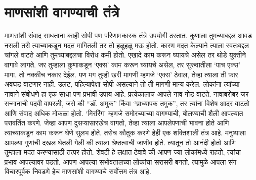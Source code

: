 \section*{माणसांशी वागण्याची तंत्रे}
माणसांशी संवाद साधताना काही सोपी पण परिणामकारक तंत्रे उपयोगी ठरतात. कुणाला तुमच्याबद्दल आवड नसली तरी त्याच्याकडून मदत मागितली तर तो हळूहळू मऊ होतो. कारण मदत केल्याने त्याला स्वतःबद्दल चांगले वाटते आणि तुमच्याबद्दलचा विरोध कमी होतो.
एखादे काम करून घ्यायचे असेल तर थोडे युक्तीने वागावे लागते. जर तुम्हाला कुणाकडून ‘एक्स’ काम करून घ्यायचे असेल, तर सुरुवातीला ‘पाच एक्स’ मागा. तो नक्कीच नकार देईल. पण मग तुम्ही खरी मागणी म्हणजे ‘एक्स’ ठेवाल, तेव्हा त्याला ती फार अवघड वाटणार नाही. उलट, पहिल्यापेक्षा सोपी असल्याने तो ती मागणी मान्य करेल.
लोकांना त्यांच्या नावाने संबोधणे हा एक साधा पण प्रभावी उपाय आहे. प्रत्येकालाच आपले नाव गोड वाटते. नावाबरोबर जर सन्मानाची पदवी वापरली, जसे की “डॉ. अमुक” किंवा “प्राध्यापक तमुक”, तर त्यांना विशेष आदर वाटतो आणि संवाद अधिक मोकळा होतो.
‘मिररिंग’ म्हणजे समोरच्याच्या वागण्याची, बोलण्याची शैली आपल्यात परावर्तित करणे. जेव्हा आपण दुसऱ्यासारखेच वागतो, तेव्हा त्याला आपलेपणाची भावना होते आणि त्याच्याकडून काम करून घेणे सुलभ होते.
तसेच कौतुक करणे हेही एक शक्तिशाली तंत्र आहे. मनुष्याला आपल्या गुणांची दखल घेतली गेली की त्याला श्रेष्ठत्वाची जाणीव होते. त्यातून तो आनंदी होतो आणि तुम्हाला मदत करण्यासाठी तत्पर होतो.
शेवटी हे लक्षात ठेवावे की आपण ज्या लोकांमध्ये राहतो, त्यांचा प्रभाव आपल्यावर पडतो. आपण आपल्या सभोवतालच्या लोकांचा सरासरी बनतो. त्यामुळे आपला संग विचारपूर्वक निवडणे हेच माणसांशी वागण्याचे सर्वोत्तम तंत्र आहे.


